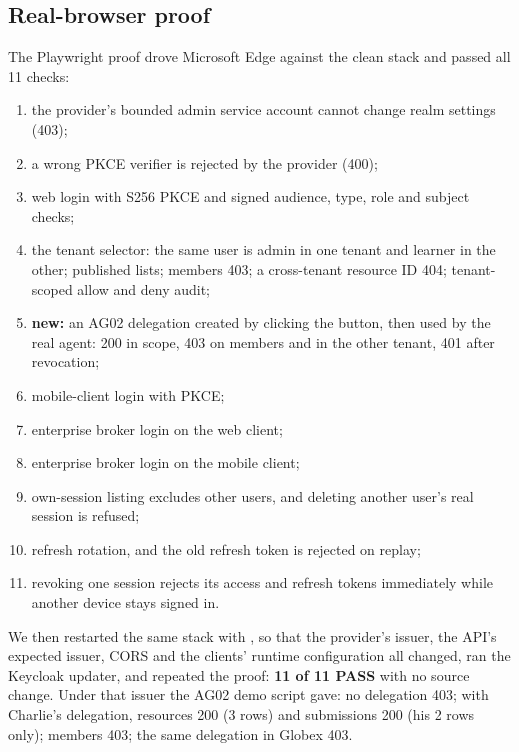 \subsection{Real-browser proof}
The Playwright proof drove Microsoft Edge against the clean stack and passed all 11 checks:
\begin{enumerate}
  \item the provider's bounded admin service account cannot change realm settings (403);
  \item a wrong PKCE verifier is rejected by the provider (400);
  \item web login with S256 PKCE and signed audience, type, role and subject checks;
  \item the tenant selector: the same user is admin in one tenant and learner in the other; published lists; members 403; a cross-tenant resource ID 404; tenant-scoped allow and deny audit;
  \item \textbf{new:} an AG02 delegation created by clicking the button, then used by the real agent: 200 in scope, 403 on members and in the other tenant, 401 after revocation;
  \item mobile-client login with PKCE;
  \item enterprise broker login on the web client;
  \item enterprise broker login on the mobile client;
  \item own-session listing excludes other users, and deleting another user's real session is refused;
  \item refresh rotation, and the old refresh token is rejected on replay;
  \item revoking one session rejects its access and refresh tokens immediately while another device stays signed in.
\end{enumerate}
We then restarted the same stack with , so that the provider's issuer, the API's expected issuer, CORS and the clients' runtime configuration all changed, ran the Keycloak updater, and repeated the proof: \textbf{11 of 11 PASS} with no source change. Under that issuer the AG02 demo script gave: no delegation 403; with Charlie's delegation, resources 200 (3 rows) and submissions 200 (his 2 rows only); members 403; the same delegation in Globex 403.

